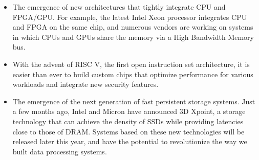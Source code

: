\documentclass [10pt]{article}
\begin{document}
\begin{outline}
\begin{itemize}[noitemsep,topsep=0pt,parsep=0pt,partopsep=0pt]
\item The emergence of new architectures that tightly integrate CPU and FPGA/GPU. For example, the latest Intel Xeon processor integrates CPU and FPGA on the same chip, and numerous vendors are working on systems in which  CPUs and GPUs share the memory via a High Bandwidth Memory bus.  

\item With the advent of RISC V, the first open instruction set architecture, it is easier than ever to build custom chips that optimize performance for various workloads and integrate new security features.

\item The emergence of the next generation of fast persistent storage systems. Just a few months ago, Intel and Micron have announced 3D Xpoint, a storage technology that can achieve the density of SSDs while providing latencies close to those of DRAM. Systems based on these new technologies will be released later this year, and have the potential to revolutionize the way we built data processing systems.
\end{itemize}













\newpage
\pagestyle{plain}

\setcounter{page}{1}


 


\newpage
\pagestyle{plain}

\setcounter{page}{1}

%



\end{outline}
\end{document}
